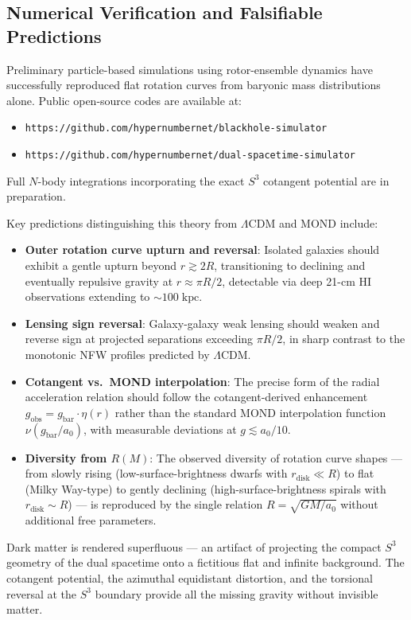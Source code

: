 \documentclass[dvipdfmx,a4paper]{article}
\begin{document}
\subsection{Numerical Verification and Falsifiable Predictions}

Preliminary particle-based simulations using rotor-ensemble dynamics have successfully reproduced flat rotation curves from baryonic mass distributions alone. Public open-source codes are available at:
\begin{itemize}
  \item \texttt{https://github.com/hypernumbernet/blackhole-simulator}
  \item \texttt{https://github.com/hypernumbernet/dual-spacetime-simulator}
\end{itemize}
Full $N$-body integrations incorporating the exact $S^3$ cotangent potential are in preparation.

Key predictions distinguishing this theory from $\Lambda$CDM and MOND include:
\begin{itemize}
  \item \textbf{Outer rotation curve upturn and reversal}: Isolated galaxies should exhibit a gentle upturn beyond $r \gtrsim 2R$, transitioning to declining and eventually repulsive gravity at $r \approx \pi R/2$, detectable via deep 21-cm HI observations extending to $\sim 100\;\mathrm{kpc}$.
  \item \textbf{Lensing sign reversal}: Galaxy-galaxy weak lensing should weaken and reverse sign at projected separations exceeding $\pi R/2$, in sharp contrast to the monotonic NFW profiles predicted by $\Lambda$CDM.
  \item \textbf{Cotangent vs.\ MOND interpolation}: The precise form of the radial acceleration relation should follow the cotangent-derived enhancement $g_{\text{obs}} = g_{\text{bar}} \cdot \eta(r)$ rather than the standard MOND interpolation function $\nu(g_{\text{bar}}/a_0)$, with measurable deviations at $g \lesssim a_0/10$.
  \item \textbf{Diversity from $R(M)$}: The observed diversity of rotation curve shapes --- from slowly rising (low-surface-brightness dwarfs with $r_{\text{disk}} \ll R$) to flat (Milky Way-type) to gently declining (high-surface-brightness spirals with $r_{\text{disk}} \sim R$) --- is reproduced by the single relation $R = \sqrt{GM/a_0}$ without additional free parameters.
\end{itemize}

Dark matter is rendered superfluous --- an artifact of projecting the compact $S^3$ geometry of the dual spacetime onto a fictitious flat and infinite background. The cotangent potential, the azimuthal equidistant distortion, and the torsional reversal at the $S^3$ boundary provide all the missing gravity without invisible matter.
\end{document}

